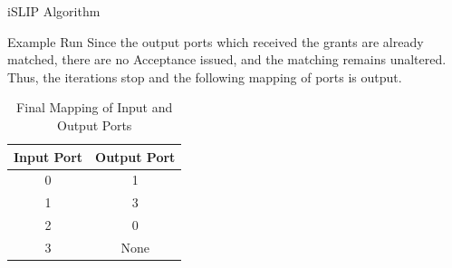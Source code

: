 \begin{section}{iSLIP Algorithm \cite{769767}}
\begin{subsection}{Example Run}
        Since the output ports which received the grants are already matched, there are no Acceptance issued, and the matching remains unaltered. Thus, the iterations stop and the following mapping of ports is output.

\begin{table}[h!]
    \centering
    \caption{Final Mapping of Input and Output Ports}
    \begin{tabular}{|c|c|}
        \hline
        \textbf{Input Port} & \textbf{Output Port} \\ \hline
        0 & 1 \\ \hline
        1 & 3 \\ \hline
        2 & 0 \\ \hline
        3 & None \\ \hline
    \end{tabular}
    \label{tab:final_mapping}
\end{table}


    \end{subsection}

\end{section}


